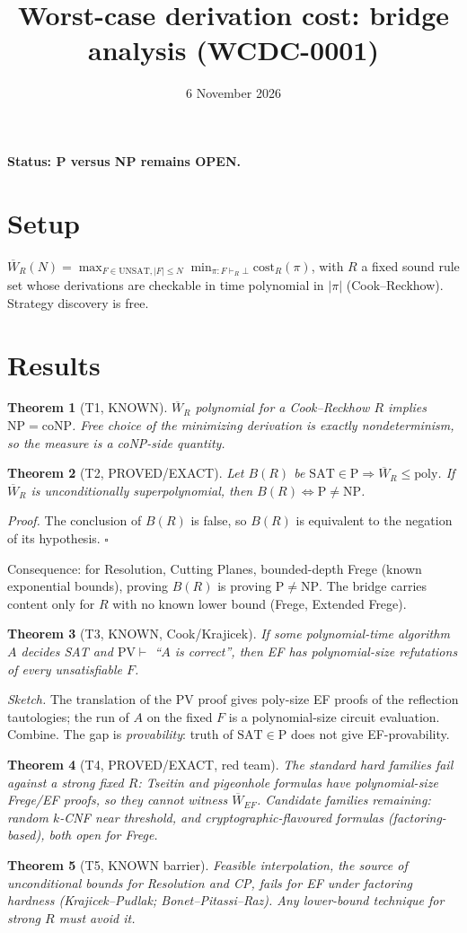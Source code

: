 \documentclass[11pt]{article}
\title{Worst-case derivation cost: bridge analysis (WCDC-0001)}
\date{6 November 2026}
\newtheorem{thm}{Theorem}
\begin{document}
\maketitle
\textbf{Status: P versus NP remains OPEN.}

\section*{Setup}
$\overline W_R(N)=\max_{F\in\mathrm{UNSAT},|F|\le N}\min_{\pi:F\vdash_R\bot}\mathrm{cost}_R(\pi)$, with $R$ a fixed sound rule set whose derivations are checkable in time polynomial in $|\pi|$ (Cook--Reckhow). Strategy discovery is free.

\section*{Results}
\begin{thm}[T1, KNOWN] $\overline W_R$ polynomial for a Cook--Reckhow $R$ implies $\mathrm{NP}=\mathrm{coNP}$. Free choice of the minimizing derivation is exactly nondeterminism, so the measure is a coNP-side quantity.\end{thm}
\begin{thm}[T2, PROVED/EXACT] Let $B(R)$ be $\mathrm{SAT}\in\mathrm P\Rightarrow\overline W_R\le\mathrm{poly}$. If $\overline W_R$ is unconditionally superpolynomial, then $B(R)\iff \mathrm P\ne\mathrm{NP}$.\end{thm}
\emph{Proof.} The conclusion of $B(R)$ is false, so $B(R)$ is equivalent to the negation of its hypothesis. $\square$

Consequence: for Resolution, Cutting Planes, bounded-depth Frege (known exponential bounds), proving $B(R)$ is proving $\mathrm P\ne\mathrm{NP}$. The bridge carries content only for $R$ with no known lower bound (Frege, Extended Frege).

\begin{thm}[T3, KNOWN, Cook/Krajicek] If some polynomial-time algorithm $A$ decides SAT and $\mathrm{PV}\vdash$ ``$A$ is correct'', then EF has polynomial-size refutations of every unsatisfiable $F$.\end{thm}
\emph{Sketch.} The translation of the PV proof gives poly-size EF proofs of the reflection tautologies; the run of $A$ on the fixed $F$ is a polynomial-size circuit evaluation. Combine. The gap is \emph{provability}: truth of $\mathrm{SAT}\in\mathrm P$ does not give EF-provability.

\begin{thm}[T4, PROVED/EXACT, red team] The standard hard families fail against a strong fixed $R$: Tseitin and pigeonhole formulas have polynomial-size Frege/EF proofs, so they cannot witness $\overline W_{EF}$. Candidate families remaining: random $k$-CNF near threshold, and cryptographic-flavoured formulas (factoring-based), both open for Frege.\end{thm}
\begin{thm}[T5, KNOWN barrier] Feasible interpolation, the source of unconditional bounds for Resolution and CP, fails for EF under factoring hardness (Krajicek--Pudlak; Bonet--Pitassi--Raz). Any lower-bound technique for strong $R$ must avoid it.\end{thm}
\end{document}
